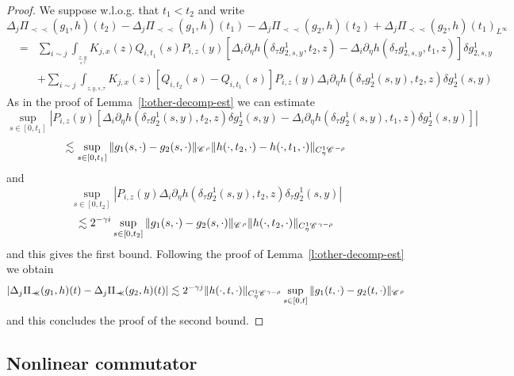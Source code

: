 \documentclass[11pt,reqno]{amsart}
\newcommand{\cdummy}{\cdot}
\newcommand{\nosymbol}{}
\newcommand{\precprec}{\prec\!\!\!\prec}
\newcommand{\CC}{\mathscr{C} \hspace{.1em}}
\begin{document}
\begin{proof}
  We suppose w.l.o.g. that $t_1 < t_2$ and write
  \[ \Delta_j \Pi_{\precprec} (g_1, h) (t_2) - \Delta_j \Pi_{\precprec} (g_1,
     h) (t_1) - \Delta_j \Pi_{\precprec} (g_2, h) (t_2) + \Delta_j
     \Pi_{\precprec} (g_2, h) (t_1)_{L^{\infty}} \]
  \begin{eqnarray*}
    & = & \sum_{i \sim j} \int_{_{\underset{s, \tau}{z, y}}} K_{j, x} (z)
    Q_{i, t_1} (s) P_{i, z} (y) [\Delta_i \partial_{\eta} h (\delta_{\tau}
    g^1_{2, s, y}, t_2, z) - \Delta_i \partial_{\eta} h (\delta_{\tau} g^1_{2,
    s, y}, t_1, z)] \delta g^1_{2, s, y}\\
    &  & + \sum_{i \sim j} \int_{_{z, y, s, \tau}} K_{j, x} (z) [Q_{i, t_2}
    (s) - Q_{i, t_1} (s)] P_{i, z} (y) \Delta_i \partial_{\eta} h
    (\delta_{\tau} g^1_2 (s, y), t_2, z) \delta g^1_2 (s, y)
  \end{eqnarray*}
  As in the proof of Lemma~\ref{l:other-decomp-est} we can estimate
  \[ \sup_{s \in [0, t_1]} \left| P_{i, z} (y) \left[ \Delta_i \partial_{\eta}
     h (\delta_{\tau} g^1_2  (s, y), t_2, z) \delta g^1_2 (s, y) - \Delta_i
     \partial_{\eta} h (\delta_{\tau} g^1_2 (s, y), t_1, z) \delta g^1_2 (s,
     y) \right] \right| \]
  \[ \lesssim \sup_{s \in [0, t_1]} \| g_1 (s, \cdummy) - g_2 (s, \cdummy)
     \|_{\CC^{\rho}} \| h (\nosymbol \cdummy, t_2, \cdummy) - h (\cdummy, t_1,
     \cdummy) \|_{C_{\eta}^1 \CC^{- \rho}} \]
  and
  \[ \sup_{s \in [0, t_2]} | P_{i, z} (y) \Delta_i \partial_{\eta} h
     (\delta_{\tau} g^1_2 (s, y), t_2, z) \delta_{\tau} g^1_2 (s, y) | \]
  \[ \lesssim 2^{- \gamma i} \sup_{s \in [0, t_2]} \| g_1 (s, \cdummy) - g_2
     (s, \cdummy) \|_{\CC^{\rho}} \| h (\cdummy, t_2, \cdummy) \|_{C_{\eta}^1
     \CC^{\gamma - \rho}} \]
  and this gives the first bound. Following the proof of
  Lemma~\ref{l:other-decomp-est} we obtain
  \[ | \Delta_j \Pi_{\precprec} (g_1, h) (t) - \Delta_j \Pi_{\precprec} (g_2,
     h) (t) | \lesssim 2^{- \gamma j} \| h (\cdummy, t, \cdummy)
     \|_{C_{\eta}^1 \CC^{\gamma - \rho}} \sup_{s \in [0, t]} \| g_1 (t,
     \cdummy) - g_2 (t, \cdummy) \|_{\CC^{\rho}} \]
  and this concludes the proof of the second bound.
\end{proof}

\subsection{Nonlinear commutator}
\end{document}
